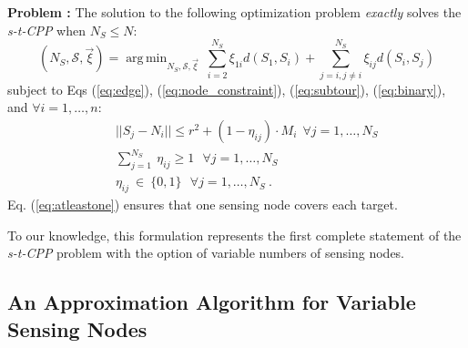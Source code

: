 \documentclass[letterpaper, 10 pt, conference]{ieeeconf}
\theoremstyle{definition}
\DeclareMathOperator*{\argmin}{arg\,min}
\begin{document}
{\bf Problem :} The solution to the following optimization problem {\em exactly} solves the {\em s-t-CPP} when $N_S\le N$:\\
  \begin{equation}\label{eq:OptProblemFull}
    (N_S,\mathcal{S},\vec{\xi}) \!= \! \argmin_{N_S,\mathcal{S},\vec{\xi}} \
            \sum_{i=2}^{N_S} \xi_{1i}d(S_1,S_i)
             + \!\!\sum_{j=i,j\ne i}^{N_S} \! \!\xi_{ij} d(S_i,S_j)
  \end{equation}
subject to Eqs (\ref{eq:edge}), (\ref{eq:node_constraint}), (\ref{eq:subtour}), (\ref{eq:binary}), and $\forall i=1,\ldots,n$:
\begin{eqnarray}
    && ||S_j - N_i|| \le r^2 + (1-\eta_{ij}) \cdot M_i \ \ \forall j=1,\ldots,N_S   \label{eq:bigM}\\
    && \sum_{j=1}^{N_S} \ \eta_{ij} \ge 1 \ \  \ \forall j=1,\ldots,N_S  \label{eq:atleastone} \\
    && \eta_{ij}\ \in \ \{0,1\}  \ \ \ \forall j=1,\ldots,N_S\ .  \label{eq:etadefn}
\end{eqnarray}
Eq. (\ref{eq:atleastone}) ensures that one sensing node covers each target.

To our knowledge, this formulation represents the first complete statement of the {\em s-t-CPP} problem with the option of variable numbers of sensing nodes.

\setlength{\textfloatsep}{15.0pt plus 2.0pt minus 2.0pt}

\subsection{An Approximation Algorithm for Variable Sensing Nodes} \label{sec:overlap_heuristic}
\end{document}
